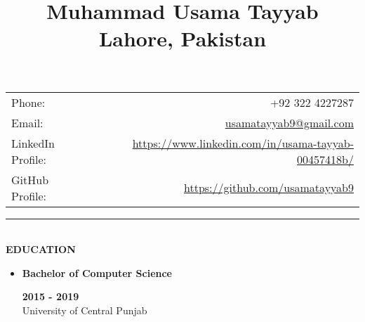 \documentclass[9pt,a4paper]{article}
\title{
	\textbf{Muhammad Usama Tayyab}\\Lahore, Pakistan
}
\date{}
\author{}
\newcommand{\MyHorizontalLine}{\noindent\rule{\linewidth}{1.5pt}\\}
\begin{document}
	\maketitle
	\begin{justify}
	\begin{tabular}{l  r}
		Phone: &+92 322 4227287\\
		Email:&\href{mailto:usamatayyab9@gmail.com}{usamatayyab9@gmail.com}\\
		LinkedIn Profile:&\href{https://www.linkedin.com/in/usama-tayyab-00457418b/}
		{https://www.linkedin.com/in/usama-tayyab-00457418b/}\\
		GitHub Profile:&\href{https://github.com/usamatayyab9}
		{https://github.com/usamatayyab9}
	\end{tabular}
\end{justify}
\MyHorizontalLine
	\textbf{EDUCATION}
	\begin{itemize}
		\item[]\raggedleft\textbf{Bachelor of Computer Science}\hfill\raggedright\textbf{2015 - 2019}\\
		University of Central Punjab
	\end{itemize}
	
\end{document}
